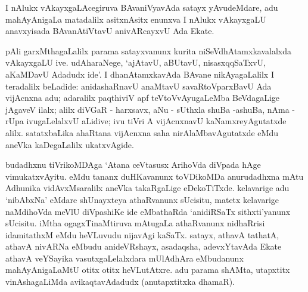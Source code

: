 I nAlukx vAkayxgaLAcegiruva BAvaniVyavAda satayx yAvudeMdare, adu mahAyAnigaLa matadalilx asitxnAsitx enunxva I nAlukx vAkayxgaLU anavxyisada BAvanAtiVtavU anivARcayxvU Ada Ekate.

pAli garxMthagaLalilx parama satayxvanunx kurita niSeVdhAtamxkavalalxda vAkayxgaLU ive. udAharaNege, `ajAtavU, aBUtavU, nisasxqqSaTxvU, aKaMDavU Adadudx ide'. I dhanAtamxkavAda BAvane nikAyagaLalilx I teradalilx beLadide: anidashaRnavU anaMtavU savaRtoVparxBavU Ada vijAcnxna adu; adaralilx paqthiviV apf teVtoVvAyugaLeMba BeVdagaLige jAgaveV ilalx; alilx diVGaR - harxsavx, aNu - sUthxla shuBa -ashuBa, nAma - rUpa ivugaLelalxvU aLidive; ivu tiVri A vijAcnxnavU kaNamxreyAgutatxde alilx. satatxbaLika ahaRtana vijAcnxna saha nirAlaMbavAgutatxde eMdu aneVka kaDegaLalilx ukatxvAgide.

budadhxnu tiVrikoMDAga `Atana ceVtasusx ArihoVda diVpada hAge vimukatx\-vAyitu. eMdu tananx duHKavanunx toVDikoMDa anurudadhxna mAtu Adhunika vidAvxMsaralilx aneVka takaRgaLige eDekoTiTxde. kelavarige adu `nibAbxNa' eMdare shUnayxteya athaRvanunx sUcisitu, matetx kelavarige naMdihoVda meVlU diVpashiKe ide eMbathaRda `anidiRSaTx sithxti'yanunx sUcisitu. iMtha ogagxTinaMtiruva mAtugaLa athaRvanunx nidhaRrisi idamitathxM eMdu heVLuvudu nijavAgi kaSaTx. satayx, athavA tathatA, athavA nivARNa eMbudu anideVRshayx, asadaqsha, adevxYtavAda Ekate athavA veYSayika vasutxgaLelalxdara mUlAdhAra eMbudanunx mahAyAnigaLaMtU otitx otitx heVLutAtxre. adu parama shAMta, utapxtitx vinAshagaLiMda avikaqtavAdadudx (anutapxtitxka dhamaR).

